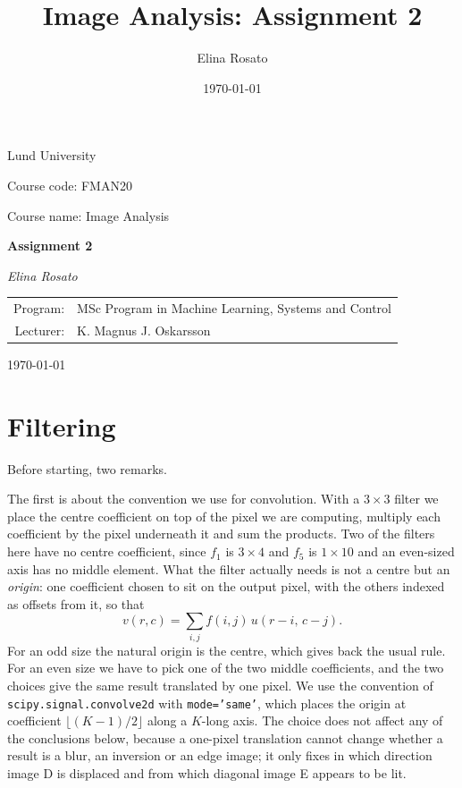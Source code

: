 \documentclass[11pt]{article}
\title{Image Analysis: Assignment 2}
\author{Elina Rosato}
\date{\today}
\begin{document}
\begin{titlepage}
    \centering
    \vspace*{2cm}

    {\Large Lund University\par}

    \vspace{1.5cm}

    {\large Course code: FMAN20\par}
    {\large Course name: Image Analysis\par}

    \vspace{3cm}

    {\Huge\bfseries Assignment 2\par}

    \vspace{3cm}

    {\large\itshape Elina Rosato\par}

    \vspace{2cm}

    \begin{tabular}{rl}
        Program: & MSc Program in Machine Learning, Systems and Control \\[4pt]
        Lecturer: & K. Magnus J. Oskarsson
    \end{tabular}

    \vfill

    {\large \today\par}
\end{titlepage}

\section{Filtering}

Before starting, two remarks.

The first is about the convention we use for convolution. With a $3\times3$
filter we place the centre coefficient on top of the pixel we are computing,
multiply each coefficient by the pixel underneath it and sum the products.
Two of the filters here have no centre coefficient, since $f_1$ is $3\times4$
and $f_5$ is $1\times10$ and an even-sized axis has no middle element. What
the filter actually needs is not a centre but an \emph{origin}: one
coefficient chosen to sit on the output pixel, with the others indexed as
offsets from it, so that
\[
    v(r,c) = \sum_{i,j} f(i,j)\, u(r-i,\, c-j).
\]
For an odd size the natural origin is the centre, which gives back the usual
rule. For an even size we have to pick one of the two middle coefficients, and
the two choices give the same result translated by one pixel. We use the
convention of \texttt{scipy.signal.convolve2d} with \texttt{mode='same'},
which places the origin at coefficient $\lfloor (K-1)/2\rfloor$ along a
$K$-long axis. The choice does not affect any of the conclusions below,
because a one-pixel translation cannot change whether a result is a blur, an
inversion or an edge image; it only fixes in which direction image D is
displaced and from which diagonal image E appears to be lit.
\end{document}
